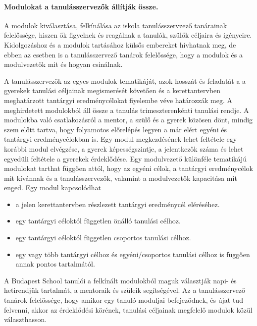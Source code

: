 \paragraph{Modulokat a tanulásszervezők állítják össze.}

A modulok kiválasztása, felkínálása az iskola tanulásszervzező tanárainak felelőssége, hiszen ők figyelnek és reagálnak a tanulók, szülők céljaira és igényeire. Kidolgozáshoz és a modulok tartásához külsős embereket hívhatnak meg, de ebben az esetben is a tanulásszervező tanárok felelőssége, hogy a modulok és a modulvezetők mit és hogyan csinálnak. 
  
A tanulásszervezők az egyes modulok tematikáját, azok hosszát és feladatát a a gyerekek tanulási céljainak megismerését követően és a kerettantervben meghatárzott tantárgyi eredménycélokat fiyelembe véve határozzák meg. A meghirdetett modulokból áll össze a tanulás trimeszterenkénti tanulási rendje. A modulokba való csatlakozásról a mentor, a szülő és a gyerek közösen dönt, mindig szem előtt tartva, hogy folyamotos előrelépés legyen a már elért egyéni és tantárgyi eredménycélokban is. Egy modul megkezdésének lehet feltétele egy korábbi modul elvégzése, a gyerek képességszintje, a jelentkezők száma és lehet egyedüli feltétele a gyerekek érdeklődése. Egy modulvezető különféle tematikájú modulokat tarthat függően attól, hogy az egyéni célok, a tantárgyi eredménycélok mit kívánnak és a tanulásszervezők, valamint a modulvezetők kapacitása mit enged. Egy modul kapcsolódhat 
  
   \begin{itemize}
  
\item  a jelen kerettantervben részlezett tantárgyi eredménycél eléréséhez. 
\item egy tantárgyi céloktól független önálló tanulási célhoz. 
\item egy tantárgyi céloktól független csoportos tanulási célhoz.  
\item egy vagy több tantárgyi célhoz és egyéni/csoportos tanulási célhoz is függően annak pontos tartalmától.
\end{itemize}
 
A Budapest School tanulói a felkínált modulokból maguk választják napi- és hetirendjük tartalmát, a mentoraik és szüleik segítségével. Az a tanulásszervező tanárok felelőssége, hogy amikor egy tanuló moduljai befejeződnek, és újat tud felvenni, akkor az érdeklődési körének, tanulási céljainak megfelelő modulok közül választhasson.

